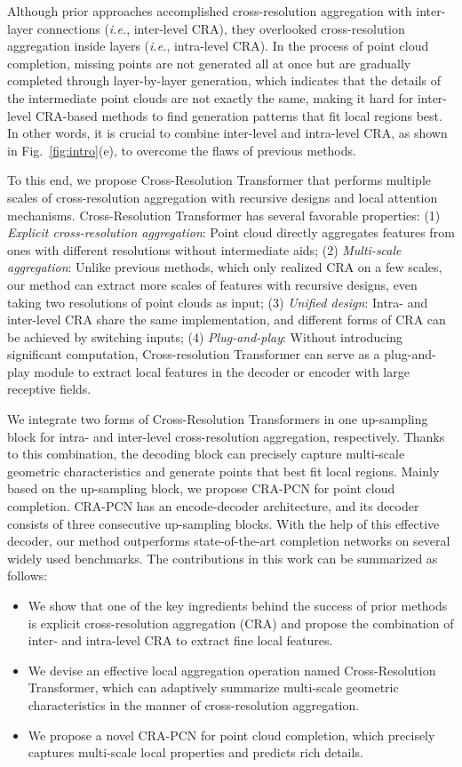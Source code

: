 \documentclass[letterpaper]{article} %
\begin{document}
Although prior approaches accomplished cross-resolution aggregation with inter-layer connections ({\em i.e.}, inter-level CRA), they overlooked cross-resolution aggregation inside layers ({\em i.e.}, intra-level CRA).
In the process of point cloud completion, missing points are not generated all at once but are gradually completed through layer-by-layer generation, which indicates that the details of the intermediate point clouds are not exactly the same, making it hard for inter-level CRA-based methods to find generation patterns that fit local regions best. 
In other words, it is crucial to combine inter-level and intra-level CRA, as shown in Fig.~\ref{fig:intro}(e), to overcome the flaws of previous methods. 

To this end, we propose Cross-Resolution Transformer that performs multiple scales of cross-resolution aggregation with recursive designs and local attention mechanisms. 
Cross-Resolution Transformer has several favorable properties: 
(1) {\em Explicit cross-resolution aggregation}: Point cloud directly aggregates features from ones with different resolutions without intermediate aids; 
(2) {\em Multi-scale aggregation}: Unlike previous methods, which only realized CRA  on a few scales, our method can extract more scales of features with recursive designs, even taking two resolutions of point clouds as input; 
(3) {\em Unified design}: Intra- and inter-level CRA  share the same implementation, and different forms of CRA can be achieved by switching inputs; 
(4) {\em Plug-and-play}: Without introducing significant computation, Cross-resolution Transformer can serve as a plug-and-play module to extract local features in the decoder or encoder with large receptive fields.

We integrate  two  forms of Cross-Resolution Transformers  in one up-sampling block  for intra- and inter-level cross-resolution aggregation, respectively.
Thanks to this combination, the decoding block can precisely capture multi-scale geometric characteristics and generate points that best fit local regions. 
Mainly based on the up-sampling block, we propose CRA-PCN for point cloud completion. 
CRA-PCN has an encode-decoder architecture, and its decoder consists of three consecutive up-sampling blocks. 
With the help of this effective decoder, our method outperforms state-of-the-art completion networks on several widely used benchmarks. 
The contributions in this work can be summarized as follows:

\begin{itemize}
\item We show that one of the key ingredients behind the success of prior methods is explicit cross-resolution aggregation (CRA) and propose the combination of inter- and intra-level CRA to extract fine local features.
\item We devise an effective local aggregation operation named Cross-Resolution Transformer, which can adaptively summarize multi-scale  geometric characteristics in the manner of cross-resolution aggregation. 
\item We propose a novel CRA-PCN for point cloud completion, which precisely captures multi-scale local properties  and predicts  rich details.
\end{itemize}
\end{document}
